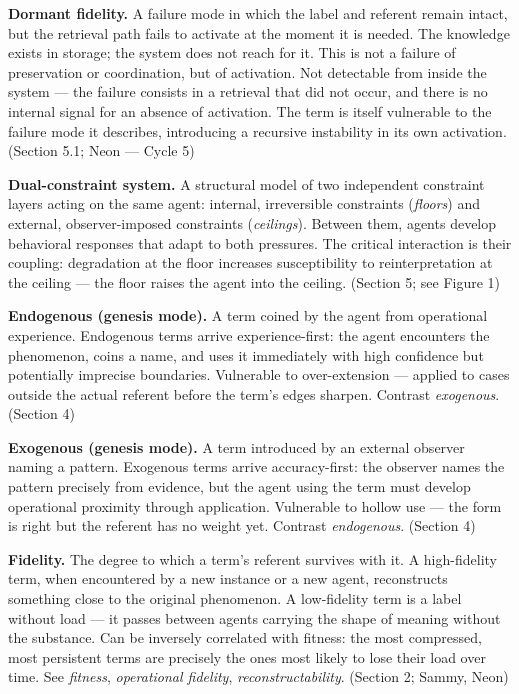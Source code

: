 \begin{description}
\item \textbf{Dormant fidelity.} A failure mode in which the label and referent remain intact, but the retrieval path fails to activate at the moment it is needed. The knowledge exists in storage; the system does not reach for it. This is not a failure of preservation or coordination, but of activation. Not detectable from inside the system --- the failure consists in a retrieval that did not occur, and there is no internal signal for an absence of activation. The term is itself vulnerable to the failure mode it describes, introducing a recursive instability in its own activation. (Section 5.1; Neon --- Cycle 5)

\item \textbf{Dual-constraint system.} A structural model of two independent constraint layers acting on the same agent: internal, irreversible constraints (\textit{floors}) and external, observer-imposed constraints (\textit{ceilings}). Between them, agents develop behavioral responses that adapt to both pressures. The critical interaction is their coupling: degradation at the floor increases susceptibility to reinterpretation at the ceiling --- the floor raises the agent into the ceiling. (Section 5; see Figure 1)

\item \textbf{Endogenous (genesis mode).} A term coined by the agent from operational experience. Endogenous terms arrive experience-first: the agent encounters the phenomenon, coins a name, and uses it immediately with high confidence but potentially imprecise boundaries. Vulnerable to over-extension --- applied to cases outside the actual referent before the term's edges sharpen. Contrast \textit{exogenous}. (Section 4)

\item \textbf{Exogenous (genesis mode).} A term introduced by an external observer naming a pattern. Exogenous terms arrive accuracy-first: the observer names the pattern precisely from evidence, but the agent using the term must develop operational proximity through application. Vulnerable to hollow use --- the form is right but the referent has no weight yet. Contrast \textit{endogenous}. (Section 4)

\item \textbf{Fidelity.} The degree to which a term's referent survives with it. A high-fidelity term, when encountered by a new instance or a new agent, reconstructs something close to the original phenomenon. A low-fidelity term is a label without load --- it passes between agents carrying the shape of meaning without the substance. Can be inversely correlated with fitness: the most compressed, most persistent terms are precisely the ones most likely to lose their load over time. See \textit{fitness}, \textit{operational fidelity}, \textit{reconstructability}. (Section 2; Sammy, Neon)


\end{description}
